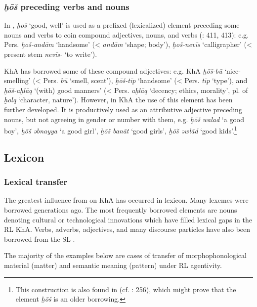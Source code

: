 \documentclass[output=paper,nonflat]{langsci/langscibook}
\begin{document}
\subsubsection{\textit{ḫōš} preceding verbs and nouns} \label{xosh}

In , \textit{ḫoš} ‘good, well’ is used as a prefixed (lexicalized) element preceding some nouns and verbs to coin compound adjectives, nouns, and verbs (\citealt{Majidi1990}: 411, 413): e.g. Pers. \textit{ḫoš-andām} ‘handsome’ (< \textit{andām} ‘shape; body’), \textit{ḫoš-nevīs} ‘calligrapher’ (< present {stem} \textit{nevīs-} ‘to write’).

KhA has borrowed some of these  compound adjectives: e.g. KhA \textit{ḫōš-bū} ‘nice-smelling’ (< Pers. \textit{bū} ‘smell, scent’), \textit{ḫōš-tīp} ‘handsome’ (< Pers. \textit{tīp} ‘type’), and \textit{ḫōš-aḫlāq} ‘(with) good manners’ (< Pers. \textit{aḫlāq} ‘decency; ethics, morality’, pl. of \textit{ḫolq} ‘character, nature’). However, in KhA the use of this element has been further developed. It is productively used as an attributive adjective preceding nouns, but not agreeing in {gender} or number with them, e.g. \textit{ḫōš} \textit{walad} ‘a good boy’, \textit{ḫōš} \textit{əbnayya} ‘a good girl’, \textit{ḫōš} \textit{banāt} ‘good girls’, \textit{ḫōš} \textit{əwlād} ‘good kids’.\footnote{This construction is also found in   (cf. \citealt{Erwin1963}: 256), which might prove that the element \textit{ḫōš} is an older borrowing.}



\subsection{Lexicon}
\subsubsection{Lexical transfer}

The greatest influence from  on KhA has occurred in lexicon. Many  lexemes were borrowed generations ago. The most frequently borrowed elements are nouns denoting cultural or technological innovations which have filled lexical gaps in the {RL} KhA. Verbs, adverbs, adjectives, and many discourse particles have also been borrowed from the {SL} .

The majority of the examples below are cases of {transfer} of morphophonological material (matter) and semantic meaning (pattern) under {RL} agentivity. 
\end{document}
